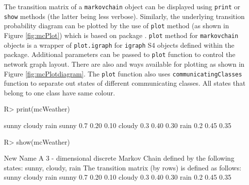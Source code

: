 \documentclass[article,nojss]{jss}
\begin{document}
The transition matrix of a \texttt{markovchain} object can be displayed using \texttt{print} or \texttt{show} methods (the latter being less verbose). Similarly, the underlying transition probability diagram can be plotted by the use of \texttt{plot} method (as shown in Figure \ref{fig:mcPlot}) which is based on  package \citep{pkg:igraph}. \texttt{plot} method for \texttt{markovchain} objects is a wrapper of \texttt{plot.igraph} for \texttt{igraph} S4 objects defined within the  package. Additional parameters can be passed to \texttt{plot} function to control the network graph layout. There are also  and  ways available for plotting as shown in Figure \ref{fig:mcPlotdiagram}. The \texttt{plot} function also uses \texttt{communicatingClasses} function to separate out states of different communicating classes. All states that belong to one class have same colour.

\begin{CodeChunk}

\begin{CodeInput}
R> print(mcWeather)
\end{CodeInput}

\begin{CodeOutput}
       sunny cloudy rain
sunny    0.7   0.20 0.10
cloudy   0.3   0.40 0.30
rain     0.2   0.45 0.35
\end{CodeOutput}

\begin{CodeInput}
R> show(mcWeather)
\end{CodeInput}

\begin{CodeOutput}
New Name 
 A  3 - dimensional discrete Markov Chain defined by the following states: 
 sunny, cloudy, rain 
 The transition matrix  (by rows)  is defined as follows: 
       sunny cloudy rain
sunny    0.7   0.20 0.10
cloudy   0.3   0.40 0.30
rain     0.2   0.45 0.35
\end{CodeOutput}
\end{CodeChunk}
\end{document}
